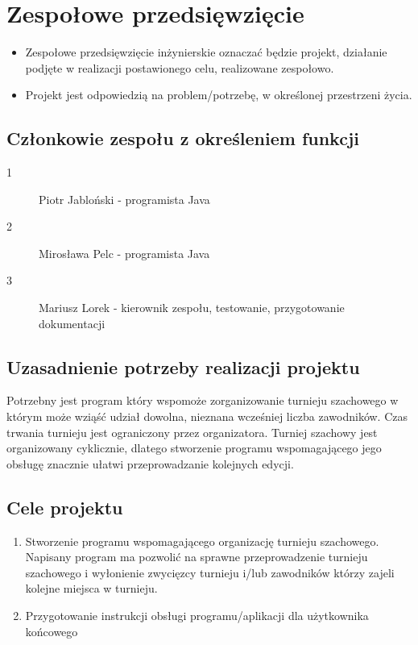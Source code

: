 \chapter{Zespołowe przedsięwzięcie}

\begin{itemize}
\item Zespołowe przedsięwzięcie inżynierskie oznaczać będzie projekt, działanie podjęte w realizacji postawionego celu, realizowane zespołowo.

\item Projekt jest odpowiedzią na problem/potrzebę, w określonej przestrzeni życia.
\end{itemize}

\section{Członkowie zespołu z określeniem funkcji}
\begin{description}
\item[1] Piotr Jabloński - programista Java
\item[2] Mirosława Pelc - programista Java
\item[3] Mariusz Lorek - kierownik zespołu, testowanie, przygotowanie dokumentacji
\end{description}

\section{Uzasadnienie potrzeby realizacji projektu}
Potrzebny jest program który wspomoże zorganizowanie turnieju szachowego w którym może wziąść udział dowolna, nieznana wcześniej liczba zawodników. Czas trwania turnieju jest ograniczony przez organizatora. Turniej szachowy jest organizowany cyklicznie, dlatego stworzenie programu wspomagającego jego obsługę znacznie ułatwi przeprowadzanie kolejnych edycji.


\section{Cele projektu}
\begin{enumerate}
\item Stworzenie programu wspomagającego organizację turnieju szachowego.
Napisany program ma pozwolić na sprawne przeprowadzenie turnieju szachowego i wyłonienie zwycięzcy turnieju i/lub zawodników którzy zajeli kolejne miejsca w turnieju.
\item Przygotowanie instrukcji obsługi programu/aplikacji dla użytkownika końcowego
\end{enumerate}
 


